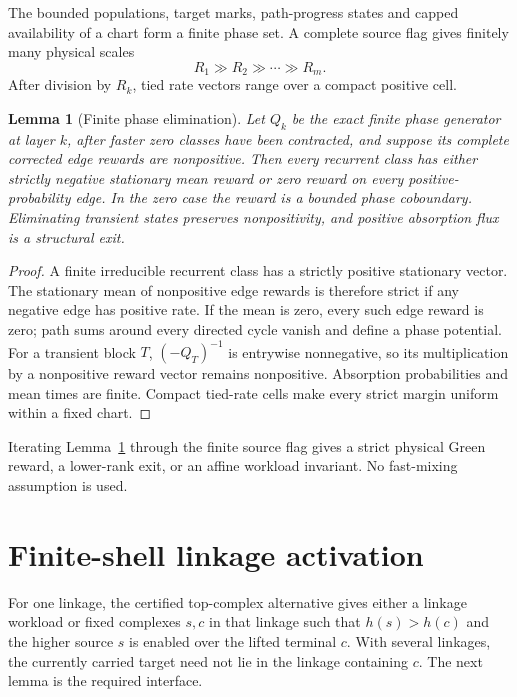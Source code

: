 \documentclass[11pt]{article}
\newtheorem{lemma}[theorem]{Lemma}
\theoremstyle{definition}\newtheorem{definition}[theorem]{Definition}
\theoremstyle{remark}\newtheorem{remark}[theorem]{Remark}
\begin{document}
The bounded populations, target marks, path-progress states and capped availability of a chart form a finite phase set.  A complete source flag gives finitely many physical scales
\[
 R_1\gg R_2\gg\cdots\gg R_m.
\]
After division by $R_k$, tied rate vectors range over a compact positive cell.

\begin{lemma}[Finite phase elimination]\label{lem:phase}
Let $Q_k$ be the exact finite phase generator at layer $k$, after faster zero classes have been contracted, and suppose its complete corrected edge rewards are nonpositive.  Then every recurrent class has either strictly negative stationary mean reward or zero reward on every positive-probability edge.  In the zero case the reward is a bounded phase coboundary.  Eliminating transient states preserves nonpositivity, and positive absorption flux is a structural exit.
\end{lemma}

\begin{proof}
A finite irreducible recurrent class has a strictly positive stationary vector.  The stationary mean of nonpositive edge rewards is therefore strict if any negative edge has positive rate.  If the mean is zero, every such edge reward is zero; path sums around every directed cycle vanish and define a phase potential.  For a transient block $T$, $(-Q_T)^{-1}$ is entrywise nonnegative, so its multiplication by a nonpositive reward vector remains nonpositive.  Absorption probabilities and mean times are finite.  Compact tied-rate cells make every strict margin uniform within a fixed chart.
\end{proof}

Iterating Lemma~\ref{lem:phase} through the finite source flag gives a strict physical Green reward, a lower-rank exit, or an affine workload invariant.  No fast-mixing assumption is used.

\section{Finite-shell linkage activation}

For one linkage, the certified top-complex alternative gives either a linkage workload or fixed complexes $s,c$ in that linkage such that $h(s)>h(c)$ and the higher source $s$ is enabled over the lifted terminal $c$.  With several linkages, the currently carried target need not lie in the linkage containing $c$.  The next lemma is the required interface.
\end{document}
